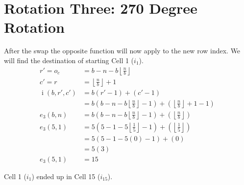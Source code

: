 \documentclass[twoside,openany,12pt]{book}
\begin{document}
    \section{Rotation Three: 270 Degree Rotation}
    After the swap the opposite function will now apply to the new row index. We will find the destination of starting Cell 1 ($i_1$). 
    \begin{align*}
        r' = o_c &= b - n - b\left\lfloor \frac{n}{b} \right\rfloor \\
        c' = r &= \left\lfloor \frac{n}{b} \right\rfloor + 1 \\
        \operatorname{i}(b,r',c') &= b(r'-1) + (c'-1) \\ 
            &= b(b - n - b\left\lfloor \frac{n}{b} \right\rfloor -1) + (\left\lfloor \frac{n}{b} \right\rfloor + 1 - 1) \\
        e_3(b,n) &= b(b - n - b\left\lfloor \frac{n}{b} \right\rfloor - 1) + (\left\lfloor \frac{n}{b} \right\rfloor) \\
        e_3(5,1) &= 5(5 - 1 - 5\left\lfloor \frac{1}{5} \right\rfloor - 1) + (\left\lfloor \frac{1}{5} \right\rfloor) \\
                 &= 5(5 - 1 - 5(0) - 1) + (0) \\
                 &= 5(3) \\
        e_3(5,1) &= 15
    \end{align*}

    Cell 1 ($i_1$) ended up in Cell 15 ($i_{15}$).
\end{document}
